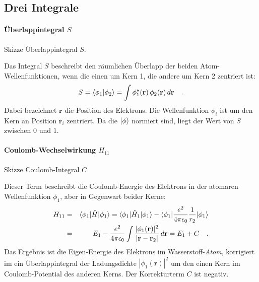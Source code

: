 \subsection{Drei Integrale}


\paragraph{Überlappintegral $S$} 
\begin{marginfigure}
\caption{Skizze   Überlappintegral $S$. }
\end{marginfigure}
%
Das Integral $S$ beschreibt den räumlichen Überlapp der beiden Atom-Wellenfunktionen, wenn die einen um Kern 1, die andere um Kern 2 zentriert ist:
\begin{equation}
 S = \braket{\phi_1 | \phi_2} = \int \phi_1^\star( \mathbf{r} )  \, \phi_2( \mathbf{r})   \, d\mathbf{r} \quad .
\end{equation}
Dabei bezeichnet $\mathbf{r}$ die Position des Elektrons. Die Wellenfunktion $\phi_i$ ist um den Kern an Position $\mathbf{r}_{i}$ zentriert. Da die $\ket{\phi}$ normiert sind, liegt der Wert von $S$ zwischen $0$ und $1$.





\paragraph{Coulomb-Wechselwirkung $H_{11}$}  
\begin{marginfigure}
\caption{Skizze Coulomb-Integral $C$ }
\end{marginfigure}
%
Dieser Term beschreibt die Coulomb-Energie des Elektrons in der atomaren Wellenfunktion $\phi_1$, aber in Gegenwart beider Kerne:
\begin{eqnarray}
H_{11} &= &  \braket{\phi_1 | \hat{H} | \phi_1} = \braket{\phi_1 | \hat{H}_1 | \phi_1}  - \braket{\phi_1 |  \frac{e^2}{4 \pi \epsilon_0} \frac{1}{r_{2}} | \phi_1}  \\
 & = & E_1 - \frac{e^2}{4 \pi \epsilon_0} \int \frac{|\phi_1(\mathbf{r})|^2 }{|\mathbf{r} - \mathbf{r}_2  |} \, d\mathbf{r} = E_1 + C \quad .
\end{eqnarray} 
Das Ergebnis ist die Eigen-Energie des Elektrons im Wasserstoff-\emph{Atom}, korrigiert im ein Überlappintegral der Ladungsdichte ${|\phi_1(\mathbf{r})|^2 }$ um den einen Kern im Coulomb-Potential des anderen Kerns. Der Korrekturterm $C$ ist negativ.




